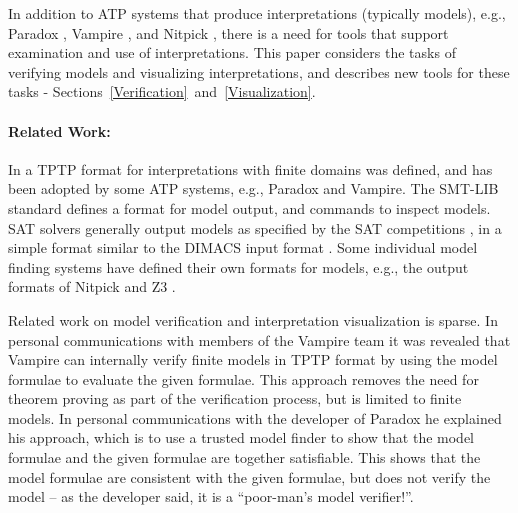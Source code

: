 \documentclass{easychair}
\begin{document}
In addition to ATP systems that produce interpretations (typically models),
e.g., Paradox \cite{CS03}, Vampire \cite{KV13}, and Nitpick \cite{BN10-ITP},
there is a need for tools that support examination and use of interpretations.
This paper considers the tasks of verifying models and visualizing interpretations, and describes 
new tools for these tasks - Sections~\ref{Verification}~and~\ref{Visualization}.

\paragraph{Related Work:}
In \cite{SS+06} a TPTP format for interpretations with finite domains was defined, and has been 
adopted by some ATP systems, e.g., Paradox and Vampire.
The SMT-LIB standard \cite{BFT17} defines a format for model output, and commands to inspect 
models.  
SAT solvers generally output models as specified by the SAT competitions \cite{JL+12}, in a 
simple format similar to the DIMACS input format \cite{Bab93}.
Some individual model finding systems have defined their own formats for models, e.g., the 
output formats of Nitpick and Z3 \cite{dMB08}.

Related work on model verification and interpretation visualization is sparse.
In personal communications with members of the Vampire team it was revealed that Vampire can 
internally verify finite models in TPTP format by using the model formulae to evaluate the given 
formulae.
This approach removes the need for theorem proving as part of the verification process, but
is limited to finite models.
In personal communications with the developer of Paradox he explained his approach, which is to 
use a trusted model finder to show that the model formulae and the given formulae are together 
satisfiable.
This shows that the model formulae are consistent with the given formulae, but does not verify 
the model -- as the developer said, it is a ``poor-man's model verifier!''.
\end{document}
